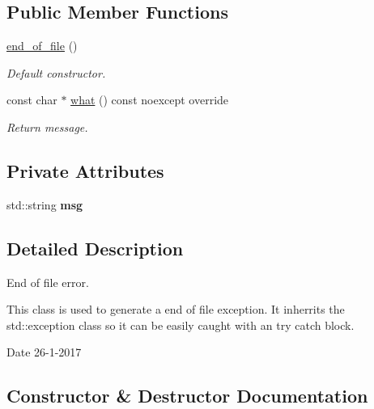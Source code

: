 \subsection*{Public Member Functions}
\begin{DoxyCompactItemize}
\item 
\hyperlink{classend__of__file_a4e87a15d753f94fad00deee27aa4dc02}{end\+\_\+of\+\_\+file} ()
\begin{DoxyCompactList}\small\item\em Default constructor. \end{DoxyCompactList}\item 
const char $\ast$ \hyperlink{classend__of__file_a32e8c4c2f39a8484c2f39f9a98d5dfb8}{what} () const noexcept override
\begin{DoxyCompactList}\small\item\em Return message. \end{DoxyCompactList}\end{DoxyCompactItemize}
\subsection*{Private Attributes}
\begin{DoxyCompactItemize}
\item 
\mbox{\label{classend__of__file_a965eafe9e5b72fbea7621c4b16e03d99}} 
std\+::string {\bfseries msg}
\end{DoxyCompactItemize}


\subsection{Detailed Description}
End of file error. 

This class is used to generate a end of file exception. It inherrits the std\+::exception class so it can be easily caught with an try catch block.

\begin{DoxyDate}{Date}
26-\/1-\/2017 
\end{DoxyDate}


\subsection{Constructor \& Destructor Documentation}
\mbox{\label{classend__of__file_a4e87a15d753f94fad00deee27aa4dc02}} 
